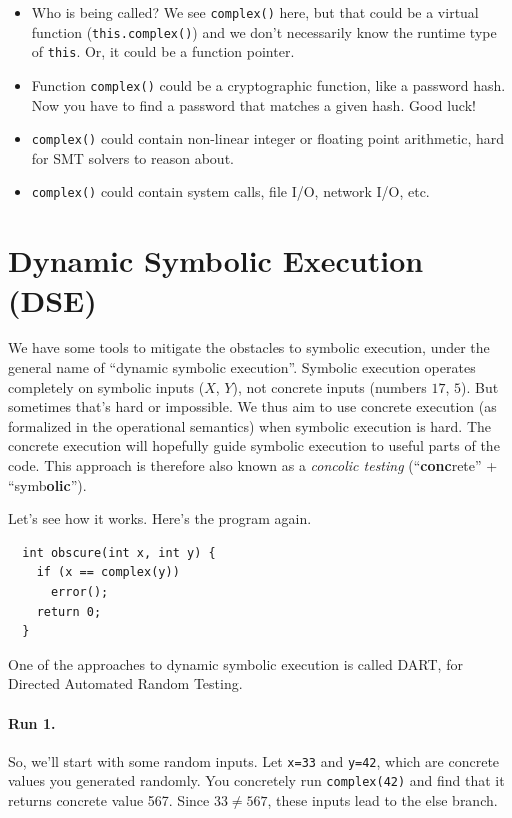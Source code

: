 \documentclass[11pt]{article}
\begin{document}
\begin{itemize}[noitemsep]
\item Who is being called? We see \texttt{complex()} here, but that could be
  a virtual function (\texttt{this.complex()}) and we don't necessarily know the
  runtime type of \texttt{this}. Or, it could be a function pointer.
\item Function \texttt{complex()} could be a cryptographic function, like a password hash.
  Now you have to find a password that matches a given hash. Good luck!
\item \texttt{complex()} could contain non-linear integer or floating point arithmetic,
  hard for SMT solvers to reason about.
\item \texttt{complex()} could contain system calls, file I/O, network I/O, etc.
\end{itemize}

\section*{Dynamic Symbolic Execution (DSE)}
We have some tools to mitigate the obstacles to symbolic execution,
under the general name of ``dynamic symbolic execution''.  Symbolic
execution operates completely on symbolic inputs ($X$, $Y$), not
concrete inputs (numbers $17$, $5$).  But sometimes that's hard or
impossible. We thus aim to use concrete execution (as formalized in
the operational semantics) when symbolic execution is hard. The
concrete execution will hopefully guide symbolic execution to useful
parts of the code. This approach is therefore also known as a
\emph{concolic testing} (``\textbf{conc}rete'' +
``symb\textbf{olic}'').

Let's see how it works. Here's the program again.

\begin{lstlisting}
  int obscure(int x, int y) {
    if (x == complex(y))
      error();
    return 0;
  }
\end{lstlisting}
One of the approaches to dynamic symbolic execution is called DART,
for Directed Automated Random Testing. 

\paragraph{Run 1.} So, we'll start with some random inputs.
Let \texttt{x=33} and \texttt{y=42}, which are concrete values you
generated randomly. You concretely run \texttt{complex(42)} and find
that it returns concrete value 567. Since $33 \neq 567$, these inputs lead to the else
branch.
\end{document}
